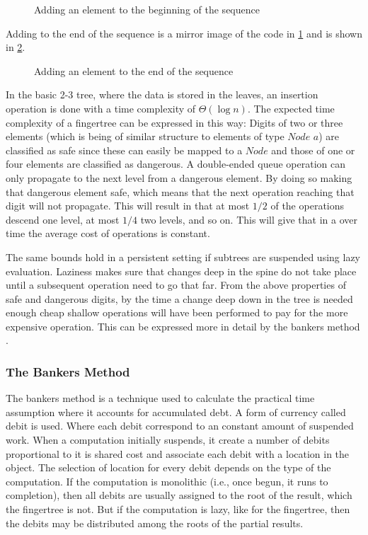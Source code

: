 \begin{figure}[h!]

\caption{Adding an element to the beginning of the sequence \label{fig:AddFirst}}
\end{figure}

Adding to the end of the sequence is a mirror image of the code in
\cref{fig:AddFirst} and is shown in \cref{fig:AddLast}.

\begin{figure}[h!]

\caption{Adding an element to the end of the sequence \label{fig:AddLast}}
\end{figure}

In the basic 2-3 tree, where the data is stored in the leaves, an insertion
operation is done with a time complexity of $\Theta (\log n)$. The expected 
time complexity of a fingertree can be expressed in this way:
Digits of two or three elements (which is being of similar structure to elements
of type $Node$ $a$) are classified as safe since these can easily be mapped to a
$Node$ and those of one or four elements are classified as dangerous. A
double-ended queue operation can only propagate to the next level from a
dangerous element. By doing so making that dangerous element safe, which means
that the next operation reaching that digit will not propagate. This will result
in that at most $1/2$ of the operations descend one level, at most $1/4$ two
levels, and so on. This will give that in a over time the average cost of
operations is constant.

The same bounds hold in a persistent setting if subtrees are suspended using lazy
evaluation. Laziness makes sure that changes deep in the spine do not take place
until a subsequent operation need to go that far. From the above properties of
safe and dangerous digits, by the time a change deep down in the tree is needed
enough cheap shallow operations will have been performed to pay for the more
expensive operation. This can be expressed more in detail by the bankers method
\cite{fingertree}.

\subsubsection{The Bankers Method}
The bankers method is a technique used to calculate the practical time
assumption where it accounts for accumulated debt. A form of currency called
debit is used. Where each debit correspond to an constant amount of suspended
work. When a computation initially suspends, it create a number of debits
proportional to it is shared cost and associate each debit with a location
in the object. The selection of location for every debit depends on the type
of the computation. If the computation is monolithic (i.e., once begun, it
runs to completion), then all debits are usually assigned to the root of the
result, which the fingertree is not. But if the computation is lazy, like for
the fingertree, then the debits may be distributed among the roots of the partial
results.

